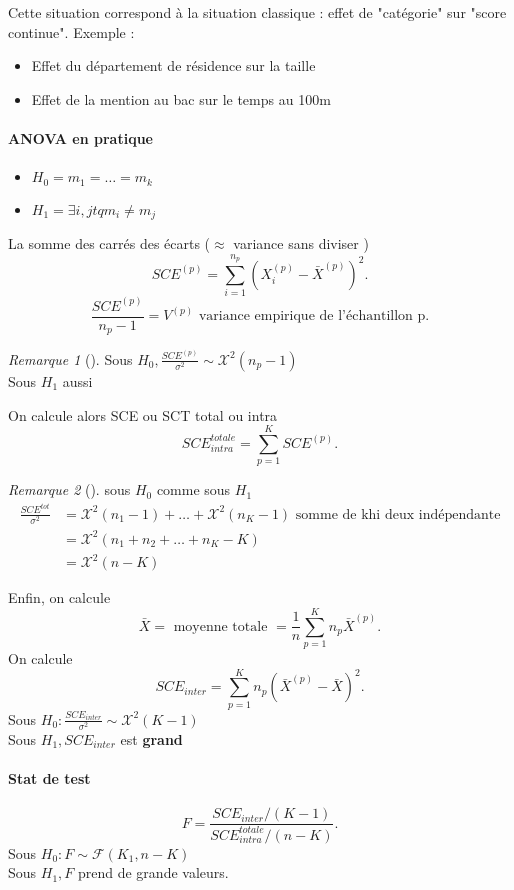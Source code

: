 \documentclass{article}
\theoremstyle{plain}%
\theoremstyle{definition}
\theoremstyle{remark}
\newtheorem*{rem}{Remarque}
\begin{document}
Cette situation correspond à la situation classique : effet de "catégorie" sur "score continue". Exemple : \begin{itemize}
    \item Effet du département de résidence sur la taille
    \item Effet de la mention au bac sur le temps au 100m
\end{itemize}

\paragraph*{ANOVA en pratique}
\begin{itemize}
    \item $ H_0 = m_1 = \dots = m_k $ 
    \item $ H_1 = \exists i,j tq m_i \neq m_j $ 
\end{itemize}
La somme des carrés des écarts ($ \approx  $ variance sans diviser )
\[
    SCE^{(p)} = \sum_{i=1}^{n_p} (X_i^{(p)} - \bar{X}^{(p)})^2
.\]
\[
    \frac{SCE ^{(p)}}{n_p-1}= V^{(p)} \text{ variance empirique de l'échantillon p}
.\]

\begin{rem}[]
    Sous $ H_0, \frac{SCE^{(p)}}{\sigma ^2} \sim \mathcal{X}^2(n_p -1) $\\
    Sous $ H_1 $ aussi
\end{rem}

On calcule alors SCE ou SCT total ou intra
\[
    SCE^{totale}_{intra} = \sum_{p=1}^{K}SCE^{(p)}
.\]
\begin{rem}[]
    sous $ H_0 $ comme sous $ H_1 $ \begin{align*}
        \frac{SCE^{tot}}{\sigma ^2} &= \mathcal{X}^2(n_1 - 1) + \dots + \mathcal{X}^2(n_K -1) \text{ somme de khi deux indépendante} \\
        &= \mathcal{X}^2(n_1 + n_2 + \dots + n_K - K) \\
        &= \mathcal{X}^2(n - K)
    \end{align*}
\end{rem}

Enfin, on calcule 
\[
    \bar{X} = \text{ moyenne totale } = \frac{1}{n}\sum_{p=1}^{K} n_p \bar{X}^{(p)}
.\]
On calcule 
\[
    SCE_{inter} = \sum_{p=1}^{K} n_p (\bar{X}^{(p)} - \bar{X})^2
.\]
Sous $ H_0 : \frac{SCE_{inter}}{\sigma ^2} \sim \mathcal{X}^2(K-1)$  \\
Sous $ H_1, SCE_{inter} $ est \textbf{grand}

\paragraph*{Stat de test}
\[
    F = \frac{SCE_{inter} / (K-1)}{SCE_{intra}^{totale} / (n-K)}
.\]
Sous $ H_0 : F \sim \mathcal{F}(K_1, n-K) $ \\
Sous $ H_1, F $ prend de grande valeurs.
\end{document}
